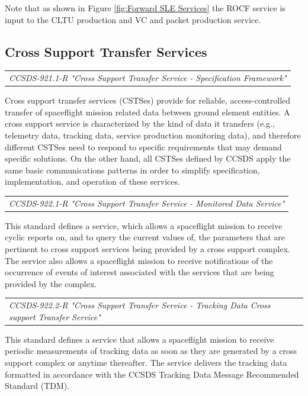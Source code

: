 Note that as shown in Figure \ref{fig:Forward SLE Services} the ROCF service is input to the CLTU production and VC and packet production service.

\subsection{Cross Support Transfer Services}

\begin{tabular}{l}
\textit{CCSDS-921.1-R "Cross Support Transfer Service - Specification Framework" \cite{CCSDS-921.1-R}} \\
\end{tabular}

Cross support transfer services (CSTSes) provide for reliable, access-controlled transfer of spaceflight mission related data between ground element entities. A cross support service is characterized by the kind of data it transfers (e.g., telemetry data,  tracking data, service production monitoring data), and therefore different CSTSes need  to respond to specific requirements that may demand specific solutions. On the other hand, all CSTSes defined by CCSDS  apply the same basic communications patterns in order  to simplify specification, implementation, and operation of these services.  

\begin{tabular}{l}
\textit{CCSDS-922.1-R "Cross Support Transfer Service - Monitored Data Service" \cite{CCSDS-922.1-R}} \\
\end{tabular}

This standard defines a service, which allows a spaceflight mission to receive cyclic reports on, and to query the current values of, the parameters that are pertinent to cross support services being provided by a cross support complex. The service also allows a spaceflight mission to receive notifications of the occurrence of events of interest associated with the services that are being provided by the complex.

\begin{tabular}{l}
\textit{CCSDS-922.2-R "Cross Support Transfer Service - Tracking Data Cross support Transfer Service" \cite{CCSDS-922.2-R}} \\
\end{tabular}

This standard defines a service that allows a spaceflight mission to receive periodic measurements of tracking data as soon as they are generated by a cross support complex or anytime thereafter. The service delivers the tracking data formatted in accordance with the CCSDS Tracking Data Message Recommended Standard (TDM).

